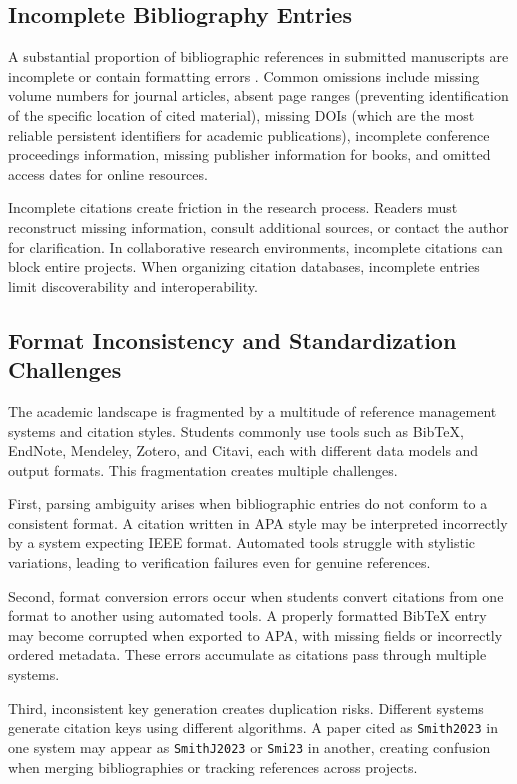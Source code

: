 \documentclass[12pt,a4paper,oneside]{report}
\begin{document}
\subsection{Incomplete Bibliography Entries}

A substantial proportion of bibliographic references in submitted manuscripts are incomplete or contain formatting errors \cite{awrey2011reference}. Common omissions include missing volume numbers for journal articles, absent page ranges (preventing identification of the specific location of cited material), missing DOIs (which are the most reliable persistent identifiers for academic publications), incomplete conference proceedings information, missing publisher information for books, and omitted access dates for online resources.

Incomplete citations create friction in the research process. Readers must reconstruct missing information, consult additional sources, or contact the author for clarification. In collaborative research environments, incomplete citations can block entire projects. When organizing citation databases, incomplete entries limit discoverability and interoperability.

\subsection{Format Inconsistency and Standardization Challenges}

The academic landscape is fragmented by a multitude of reference management systems and citation styles. Students commonly use tools such as BibTeX, EndNote, Mendeley, Zotero, and Citavi, each with different data models and output formats. This fragmentation creates multiple challenges.

First, parsing ambiguity arises when bibliographic entries do not conform to a consistent format. A citation written in APA style may be interpreted incorrectly by a system expecting IEEE format. Automated tools struggle with stylistic variations, leading to verification failures even for genuine references.

Second, format conversion errors occur when students convert citations from one format to another using automated tools. A properly formatted BibTeX entry may become corrupted when exported to APA, with missing fields or incorrectly ordered metadata. These errors accumulate as citations pass through multiple systems.

Third, inconsistent key generation creates duplication risks. Different systems generate citation keys using different algorithms. A paper cited as \texttt{Smith2023} in one system may appear as \texttt{SmithJ2023} or \texttt{Smi23} in another, creating confusion when merging bibliographies or tracking references across projects.
\end{document}
